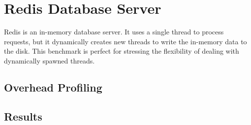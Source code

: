 \section{Redis Database Server}
Redis is an in-memory database server. It uses a single thread to process requests, but it dynamically creates new threads to write the in-memory data to the disk. This benchmark is perfect for stressing the flexibility of dealing with dynamically spawned threads.

\subsection{Overhead Profiling}
\subsection{Results}

